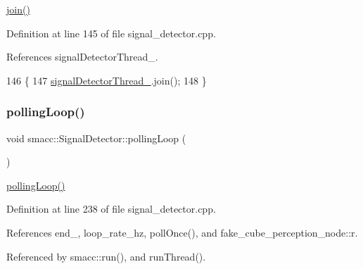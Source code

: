 \hyperlink{classsmacc_1_1SignalDetector_a636f704e469bf74b4a9fdb15bd63d5be}{join()} 

Definition at line 145 of file signal\+\_\+detector.\+cpp.



References signal\+Detector\+Thread\+\_\+.


\begin{DoxyCode}
146     \{
147         \hyperlink{classsmacc_1_1SignalDetector_a4346a400cd37eafc5d1d2e63d975785e}{signalDetectorThread\_}.join();
148     \}
\end{DoxyCode}
\mbox{\label{classsmacc_1_1SignalDetector_a2665e66cdae9f6533c64bbcecf3fa199}} 
\subsubsection{\texorpdfstring{polling\+Loop()}{pollingLoop()}}
{\footnotesize\ttfamily void smacc\+::\+Signal\+Detector\+::polling\+Loop (\begin{DoxyParamCaption}{ }\end{DoxyParamCaption})}

\hyperlink{classsmacc_1_1SignalDetector_a2665e66cdae9f6533c64bbcecf3fa199}{polling\+Loop()} 

Definition at line 238 of file signal\+\_\+detector.\+cpp.



References end\+\_\+, loop\+\_\+rate\+\_\+hz, poll\+Once(), and fake\+\_\+cube\+\_\+perception\+\_\+node\+::r.



Referenced by smacc\+::run(), and run\+Thread().


